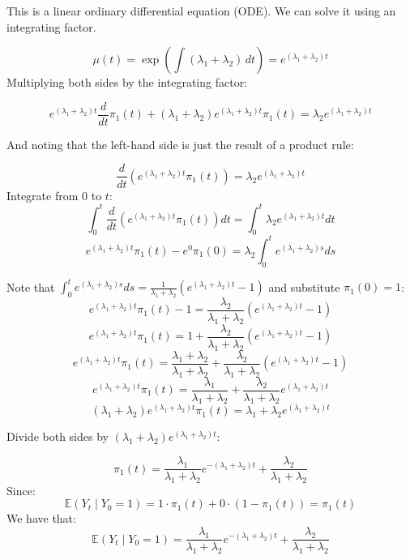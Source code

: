 \documentclass[11pt]{extarticle}
\theoremstyle{plain}
\theoremstyle{definition}
\begin{document}
\begin{enumerate}[(a)]
This is a linear ordinary differential equation (ODE). We can solve it using an integrating factor.

   \[
   \mu(t) = \exp\left( \int (\lambda_1 + \lambda_2) \, dt \right) = e^{(\lambda_1 + \lambda_2)t}
   \]
Multiplying both sides by the integrating factor:

   \[
   e^{(\lambda_1 + \lambda_2)t} \frac{d}{dt} \pi_1(t) + (\lambda_1 + \lambda_2) e^{(\lambda_1 + \lambda_2)t} \pi_1(t) = \lambda_2 e^{(\lambda_1 + \lambda_2)t}
   \]

And noting that the left-hand side is just the result of a product rule:

   \[
   \frac{d}{dt} \left( e^{(\lambda_1 + \lambda_2)t} \pi_1(t) \right) = \lambda_2 e^{(\lambda_1 + \lambda_2)t}
   \]
   Integrate from \( 0 \) to \( t \):
   \[
   \int_{0}^{t} \frac{d}{dt} \left( e^{(\lambda_1 + \lambda_2)t} \pi_1(t) \right) dt = \int_{0}^{t} \lambda_2 e^{(\lambda_1 + \lambda_2)t} dt
   \]
   \[
   e^{(\lambda_1 + \lambda_2)t} \pi_1(t) - e^{0} \pi_1(0) = \lambda_2 \int_{0}^{t} e^{(\lambda_1 + \lambda_2)s} ds
   \]

Note that $\int_{0}^{t} e^{(\lambda_1 + \lambda_2)s} ds = \frac{1}{\lambda_1 + \lambda_2} \left( e^{(\lambda_1 + \lambda_2)t} - 1 \right)$ and substitute \( \pi_1(0) = 1 \):
   \[
   e^{(\lambda_1 + \lambda_2)t} \pi_1(t) - 1 = \frac{\lambda_2}{\lambda_1 + \lambda_2} \left( e^{(\lambda_1 + \lambda_2)t} - 1 \right)
   \]
   \[
   e^{(\lambda_1 + \lambda_2)t} \pi_1(t) = 1 + \frac{\lambda_2}{\lambda_1 + \lambda_2} \left( e^{(\lambda_1 + \lambda_2)t} - 1 \right)
   \]
   \[
   e^{(\lambda_1 + \lambda_2)t} \pi_1(t) = \frac{\lambda_1 + \lambda_2}{\lambda_1 + \lambda_2} + \frac{\lambda_2}{\lambda_1 + \lambda_2} \left( e^{(\lambda_1 + \lambda_2)t} - 1 \right)
   \]
   \[
   e^{(\lambda_1 + \lambda_2)t} \pi_1(t) = \frac{\lambda_1}{\lambda_1 + \lambda_2} + \frac{\lambda_2}{\lambda_1 + \lambda_2} e^{(\lambda_1 + \lambda_2)t}
   \]
   \[
   (\lambda_1 + \lambda_2) e^{(\lambda_1 + \lambda_2)t} \pi_1(t) = \lambda_1 + \lambda_2 e^{(\lambda_1 + \lambda_2)t}
   \]

   Divide both sides by \( (\lambda_1 + \lambda_2) e^{(\lambda_1 + \lambda_2)t} \):

   \[
   \pi_1(t) = \frac{\lambda_1}{\lambda_1 + \lambda_2} e^{-(\lambda_1 + \lambda_2)t} + \frac{\lambda_2}{\lambda_1 + \lambda_2}
   \]
Since:
\[
\mathbb{E}(Y_t \mid Y_0 = 1) = 1 \cdot \pi_1(t) + 0 \cdot \left( 1 - \pi_1(t) \right) = \pi_1(t)
\]
We have that:
\[
\mathbb{E}(Y_t \mid Y_0 = 1) = \frac{\lambda_1}{\lambda_1 + \lambda_2} e^{-(\lambda_1 + \lambda_2)t} + \frac{\lambda_2}{\lambda_1 + \lambda_2}
\]

\end{enumerate}
\end{document}

